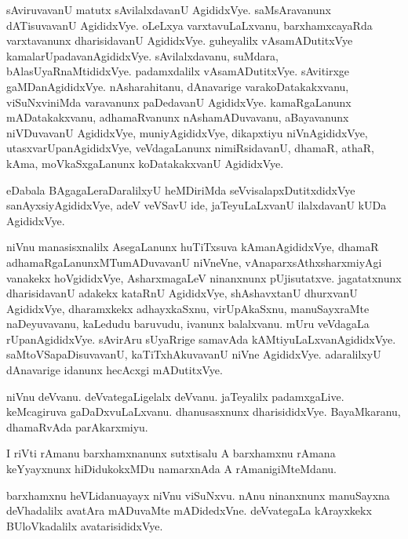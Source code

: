 \begin{mng}
sAviruvavanU matutx sAvilalxdavanU AgididxVye. saMsAravanunx dATisuvavanU AgididxVye. oLeLxya varxtavuLaLxvanu, barxhamxcayaRda varxtavanunx dharisidavanU AgididxVye. guheyalilx vAsamADutitxVye kamalarUpadavanAgididxVye. sAvilalxdavanu, suMdara, bAlasUyaRnaMtididxVye. padamxdalilx vAsamADutitxVye. sAvitirxge gaMDanAgididxVye. nAsharahitanu, dAnavarige varakoDatakakxvanu, viSuNxviniMda varavanunx paDedavanU AgididxVye. kamaRgaLanunx mADatakakxvanu, adhamaRvanunx nAshamADuvavanu, aBayavanunx niVDuvavanU AgididxVye, muniyAgididxVye, dikapxtiyu niVnAgididxVye, utasxvarUpanAgididxVye, veVdagaLanunx nimiRsidavanU, dhamaR, athaR, kAma, moVkaSxgaLanunx koDatakakxvanU AgididxVye.
\end{mng}

\begin{mng}
eDabala BAgagaLeraDaralilxyU heMDiriMda seVvisalapxDutitxdidxVye sanAyxsiyAgididxVye, adeV veVSavU ide, jaTeyuLaLxvanU ilalxdavanU kUDa AgididxVye.
\end{mng}

\begin{mng}
niVnu manasisxnalilx AsegaLanunx huTiTxsuva kAmanAgididxVye, dhamaR adhamaRgaLanunxMTumADuvavanU niVneVne, vAnaparxsAthxsharxmiyAgi vanakekx hoVgididxVye, AsharxmagaLeV ninanxnunx pUjisutatxve. jagatatxnunx dharisidavanU adakekx kataRnU AgididxVye, shAshavxtanU dhurxvanU AgididxVye, dharamxkekx adhayxkaSxnu, virUpAkaSxnu, manuSayxraMte naDeyuvavanu, kaLedudu baruvudu, ivanunx balalxvanu. mUru veVdagaLa rUpanAgididxVye. sAvirAru sUyaRrige samavAda kAMtiyuLaLxvanAgididxVye. saMtoVSapaDisuvavanU, kaTiTxhAkuvavanU niVne AgididxVye. adaralilxyU dAnavarige idanunx hecAcxgi mADutitxVye.
\end{mng}

\begin{mng}
niVnu deVvanu. deVvategaLigelalx deVvanu. jaTeyalilx padamxgaLive. keMcagiruva gaDaDxvuLaLxvanu. dhanusasxnunx dharisididxVye. BayaMkaranu, dhamaRvAda parAkarxmiyu.
\end{mng}

\begin{mng}
I riVti rAmanu barxhamxnanunx sutxtisalu A barxhamxnu rAmana keYyayxnunx hiDidukokxMDu namarxnAda A rAmanigiMteMdanu. 
\end{mng}

\begin{mng}
barxhamxnu heVLidanu\mdash ayayx niVnu viSuNxvu. nAnu ninanxnunx manuSayxna deVhadalilx avatAra mADuvaMte mADidedxVne. deVvategaLa kArayxkekx BUloVkadalilx avatarisididxVye.
\end{mng}

